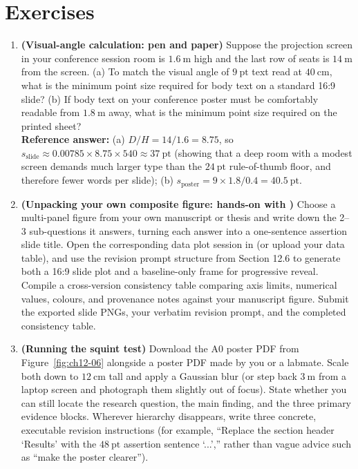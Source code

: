\section{Exercises}

\begin{enumerate}
\item \textbf{(Visual-angle calculation: pen and paper)} Suppose the projection screen in your conference session room is $1.6\ \text{m}$ high and the last row of seats is $14\ \text{m}$ from the screen. (a) To match the visual angle of $9\ \text{pt}$ text read at $40\ \text{cm}$, what is the minimum point size required for body text on a standard 16:9 slide? (b) If body text on your conference poster must be comfortably readable from $1.8\ \text{m}$ away, what is the minimum point size required on the printed sheet?\\
{\footnotesize \textbf{Reference answer:} (a) $D/H = 14 / 1.6 = 8.75$, so $s_{\text{slide}} \approx 0.00785 \times 8.75 \times 540 \approx 37\ \text{pt}$ (showing that a deep room with a modest screen demands much larger type than the $24\ \text{pt}$ rule-of-thumb floor, and therefore fewer words per slide); (b) $s_{\text{poster}} = 9 \times 1.8 / 0.4 = 40.5\ \text{pt}$.}

\item \textbf{(Unpacking your own composite figure: hands-on with \scidraw{})} Choose a multi-panel figure from your own manuscript or thesis and write down the 2--3 sub-questions it answers, turning each answer into a one-sentence assertion slide title. Open the corresponding data plot session in  (or upload your data table), and use the revision prompt structure from Section 12.6 to generate both a 16:9 slide plot and a baseline-only frame for progressive reveal. Compile a cross-version consistency table comparing axis limits, numerical values, colours, and provenance notes against your manuscript figure. Submit the exported slide PNGs, your verbatim revision prompt, and the completed consistency table.

\item \textbf{(Running the squint test)} Download the A0 poster PDF from Figure~\ref{fig:ch12-06} alongside a poster PDF made by you or a labmate. Scale both down to $12\ \text{cm}$ tall and apply a Gaussian blur (or step back $3\ \text{m}$ from a laptop screen and photograph them slightly out of focus). State whether you can still locate the research question, the main finding, and the three primary evidence blocks. Wherever hierarchy disappears, write three concrete, executable revision instructions (for example, ``Replace the section header `Results' with the $48\ \text{pt}$ assertion sentence `...','' rather than vague advice such as ``make the poster clearer'').
\end{enumerate}

